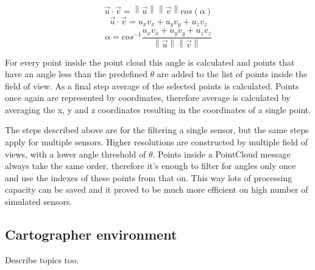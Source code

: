 \begin{equation} \label{eq:vec_product_angle}
    \vec{u}\cdot\vec{v}=\left\|\vec{u}\right\|\left\|\vec{v}\right\|cos(\alpha)
\end{equation}
\begin{equation} \label{eq:vec_product_coordinates}
    \vec{u}\cdot\vec{v}=u_{x}v_{x}+u_{y}v_{y}+u_{z}v_{z}
\end{equation}
\begin{equation} \label{eq:vec_product_final}
    \alpha = cos^{-1}\frac{u_{x}v_{x}+u_{y}v_{y}+u_{z}v_{z}}{\left\|\vec{u}\right\|\left\|\vec{v}\right\|}
\end{equation}

For every point inside the point cloud this angle is calculated and points that have an angle less than the 
predefined $\theta$ are added to the list of points inside the field of view. As a final step average of the 
selected points is calculated. Points once again are represented by coordinates, therefore average is calculated 
by averaging the x, y and z coordinates resulting in the coordinates of a single point.

The steps described above are for the filtering a single sensor, but the same steps apply for multiple 
sensors. Higher resolutions are constructed by multiple field of views, with a lower angle threshold of 
$\theta$. Points inside a PointCloud message always take the same order, therefore it's enough to filter 
for angles only once and use the indexes of these points from that on. This way lots of processing capacity
can be saved and it proved to be much more efficient on high number of simulated sensors.

\subsection{Cartographer environment} \label{sect:cartographer_environment}
Describe topics too.










